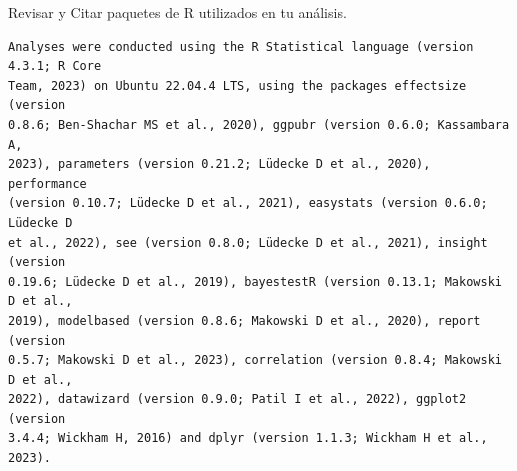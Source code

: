 \documentclass[
  10pt]{article}
\begin{document}
\begin{tcolorbox}[enhanced jigsaw, leftrule=.75mm, colframe=quarto-callout-color-frame, breakable, opacityback=0, bottomrule=.15mm, left=2mm, rightrule=.15mm, arc=.35mm, toprule=.15mm, colback=white]

Revisar y Citar paquetes de R utilizados en tu análisis.

\begin{verbatim}
Analyses were conducted using the R Statistical language (version 4.3.1; R Core
Team, 2023) on Ubuntu 22.04.4 LTS, using the packages effectsize (version
0.8.6; Ben-Shachar MS et al., 2020), ggpubr (version 0.6.0; Kassambara A,
2023), parameters (version 0.21.2; Lüdecke D et al., 2020), performance
(version 0.10.7; Lüdecke D et al., 2021), easystats (version 0.6.0; Lüdecke D
et al., 2022), see (version 0.8.0; Lüdecke D et al., 2021), insight (version
0.19.6; Lüdecke D et al., 2019), bayestestR (version 0.13.1; Makowski D et al.,
2019), modelbased (version 0.8.6; Makowski D et al., 2020), report (version
0.5.7; Makowski D et al., 2023), correlation (version 0.8.4; Makowski D et al.,
2022), datawizard (version 0.9.0; Patil I et al., 2022), ggplot2 (version
3.4.4; Wickham H, 2016) and dplyr (version 1.1.3; Wickham H et al., 2023).


\end{verbatim}
\end{tcolorbox}
\end{document}
